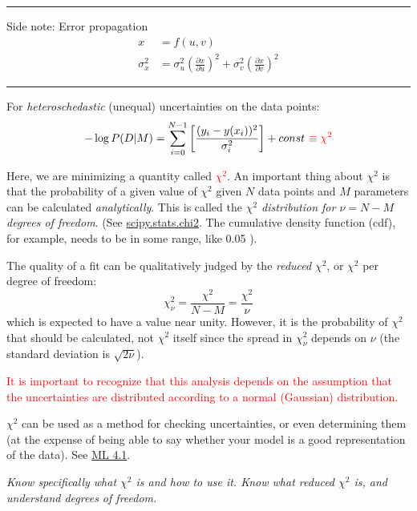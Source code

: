 \documentclass{article}
\newcommand{\test}[1]{%
    \begin{center}
        \colorbox{hl}{\parbox{0.9\textwidth}{\emph{\centering #1}}}
    \end{center}}
\begin{document}
\hrule
Side note: Error propagation
\begin{align*}
    x &= f(u,v)\\
    \sigma_{x}^{2} &=
    \sigma_{u}^{2}\left(\frac{\partial{x}}{\partial{u}}\right)^{2} +
    \sigma_{v}^{2}\left(\frac{\partial{x}}{\partial{v}}\right)^{2}
\end{align*}
\hrule

For \emph{heteroschedastic} (unequal) uncertainties on the data points:
$$ -\log P(D|M) = \sum_{i=0}^{N-1}\left[
\frac{(y_i-y(x_i))^{2}}{\sigma_{i}^{2}}\right] + const\
\textcolor{red}{\equiv \chi^2} $$

Here, we are minimizing a quantity called \textcolor{red}
{$\chi^{2}$}. An important thing about $\chi^{2}$ is that the probability
of a given value of $\chi^{2}$ given $N$ data points and $M$ parameters
can be calculated \emph{analytically}. This is called the
{\it $\chi^2$ distribution for $\nu = N-M$ degrees of freedom}.
(See
\href{http://docs.scipy.org/doc/scipy-0.15.1/reference/generated/scipy.stats.chi2.html}
{scipy.stats.chi2}. The cumulative density function (cdf), for example,
needs to be in some range, like 0.05 \- 0.95).

The quality of a fit can be qualitatively judged by the
\emph{reduced} $\chi^2$, or $\chi^2$ per degree of freedom:
$$  \chi_{\nu}^{2} = \frac{\chi^{2}}{N-M} = \frac{\chi^{2}}{\nu}
$$
which is expected to have a value near unity.
However, it is the probability of $\chi^2$ that should be calculated, not
$\chi^{2}$ itself since
the spread in $\chi_{\nu}^2$ depends on $\nu$ (the standard deviation
is $\sqrt{2\nu}$).

\textcolor{red}{It is important to recognize that this analysis depends
on the assumption that the uncertainties are distributed according to
a normal (Gaussian) distribution.}

$\chi^{2}$ can be used as a method for checking uncertainties, or even
determining them (at the expense of being able to say whether your
model is a good representation of the data).
See \href{http://astronomy.nmsu.edu/holtz/a575/images/ML4.1.png}
{ML 4.1}.

\test{Know specifically what $\chi^{2}$ is and how to use it.  Know what reduced
$\chi^{2}$ is, and understand degrees of freedom.}
\end{document}
